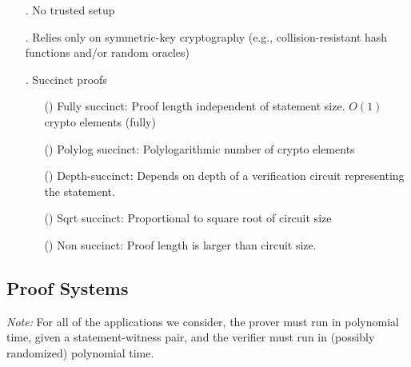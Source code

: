 \begin{enumerate}
    \item[\newfeat.\label{feat:plain}] No trusted setup
    \item[\newfeat.\label{feat:symm-key}] Relies only on symmetric-key cryptography (e.g., collision-resistant hash functions and/or random oracles)
    \item[\newfeat.\label{feat:succint}] Succinct proofs
				\begin{enumerate}
        \item[(\newsubfeat)\label{subfeat:succinct:fully}] Fully succinct: Proof length independent of statement size. $O(1)$ crypto elements (fully)
        \item[(\newsubfeat)\label{subfeat:succinct:polylog}] Polylog succinct: Polylogarithmic number of crypto elements
        \item[(\newsubfeat)\label{subfeat:succinct:depth}] Depth-succinct: Depends on depth of a verification circuit representing the statement.
        \item[(\newsubfeat)\label{subfeat:succinct:sqrt}] Sqrt succinct: Proportional to square root of circuit size
        \item[(\newsubfeat)\label{subfeat:succinct:non}] Non succinct: Proof length is larger than circuit size.
				\end{enumerate}
\end{enumerate}


\subsection{Proof Systems}

\emph{Note:} For all of the applications we consider, the prover must run in polynomial time, given a statement-witness pair, and the verifier must run in (possibly randomized) polynomial time.\loosen

